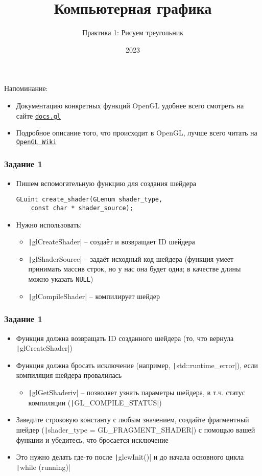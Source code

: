 \documentclass[10pt]{beamer}
\title{Компьютерная графика}
\subtitle{Практика 1: Рисуем треугольник}
\date{2023}
\begin{document}
\frame{\titlepage}

\begin{frame}[fragile]
\frametitle{}
Напоминание:
\begin{itemize}
\item Документацию конкретных функций OpenGL удобнее всего смотреть на сайте \href{https://docs.gl/}{\nolinkurl{docs.gl}}
\item Подробное описание того, что происходит в OpenGL, лучше всего читать на \href{https://www.khronos.org/opengl/wiki/Main_Page}{\texttt{OpenGL Wiki}}
\end{itemize}
\end{frame}

\begin{frame}[fragile]
\frametitle{Задание 1}
\begin{itemize}
\item Пишем вспомогательную функцию для создания шейдера
\begin{verbatim}
GLuint create_shader(GLenum shader_type,
    const char * shader_source);
\end{verbatim}
\item Нужно использовать:
\begin{itemize}
\item \texttt|glCreateShader| -- создаёт и возвращает ID шейдера
\item \texttt|glShaderSource| -- задаёт исходный код шейдера (функция умеет принимать массив строк, но у нас она будет одна; в качестве длины можно указать \verb|NULL|)
\item \texttt|glCompileShader| -- компилирует шейдер
\end{itemize}
\end{itemize}
\end{frame}

\begin{frame}[fragile]
\frametitle{Задание 1}
\begin{itemize}
\item Функция должна возвращать ID созданного шейдера (то, что вернула \texttt|glCreateShader|)
\item Функция должна бросать исключение (например, \texttt|std::runtime_error|), если компиляция шейдера провалилась
\begin{itemize}
\item \texttt|glGetShaderiv| -- позволяет узнать параметры шейдера, в т.ч. статус компиляции (\texttt|GL_COMPILE_STATUS|)
\end{itemize}
\item Заведите строковую константу с любым значением, создайте фрагментный шейдер (\texttt|shader_type = GL_FRAGMENT_SHADER|) с помощью вашей функции и убедитесь, что бросается исключение
\item Это нужно делать где-то после \texttt|glewInit()| и до начала основного цикла \texttt|while (running)|
\end{itemize}
\end{frame}
\end{document}
